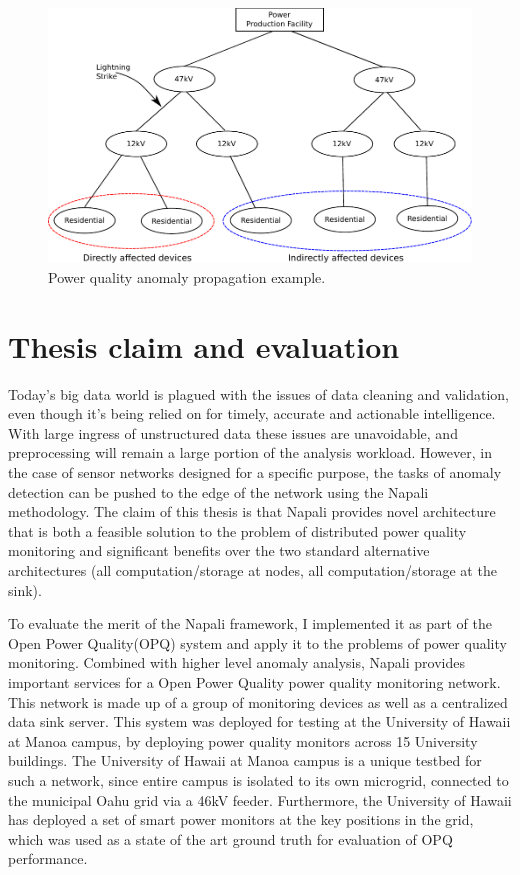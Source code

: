 \begin{figure}[h]
    \centering
    \includegraphics[width=0.9\linewidth]{img/grid_hierarchy_cartoon.pdf}
    \caption{Power quality anomaly propagation example.}
    \label{intro:fig2}
\end{figure}

\section{Thesis claim and evaluation} \label{intro:sec:claim}

Today's big data world is plagued with the issues of data cleaning and validation, even though it's being relied on for timely, accurate and actionable intelligence.
With large ingress of unstructured data these issues are unavoidable, and preprocessing will remain a large portion of the analysis workload.
However, in the case of sensor networks designed for a specific purpose, the tasks of anomaly detection can be pushed to the edge of the network using the Napali methodology.
The claim of this thesis is that Napali provides novel architecture that is both a feasible solution to the problem of distributed power quality monitoring and significant benefits over the two standard alternative architectures (all computation/storage at nodes, all computation/storage at the sink).

To evaluate the merit of the Napali framework, I implemented it as part of the Open Power Quality(OPQ) system and apply it to the problems of power quality monitoring.
Combined with higher level anomaly analysis, Napali provides important services for a Open Power Quality power quality monitoring network.
This network is made up of a group of monitoring devices as well as a centralized data sink server.
This system was deployed for testing at the University of Hawaii at Manoa campus, by deploying power quality monitors across 15 University buildings.
The University of Hawaii at Manoa campus is a unique testbed for such a network, since entire campus is isolated to its own microgrid, connected to the municipal Oahu grid via a 46kV feeder.
Furthermore, the University of Hawaii has deployed a set of smart power monitors at the key positions in the grid, which was used as a state of the art ground truth for evaluation of OPQ performance.


